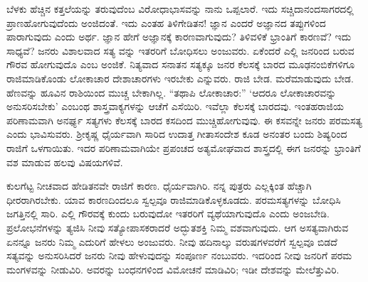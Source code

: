 ಬೆಳಕು ಹೆಚ್ಚಿನ ಕತ್ತಲೆಯನ್ನು ತರುವುದೆಂಬ ವಿರೋಧಾಭಾಸವನ್ನು ನಾನು ಒಪ್ಪಲಾರೆ. ಇದು ಸಚ್ಚಿದಾನಂದಸಾಗರದಲ್ಲಿ ಪ್ರಾಣಹೋಗುವುದೆಂದು ಅಂಜಿದಂತೆ. ಇದು ಎಂತಹ ತಿಳಿಗೇಡಿತನ! ಜ್ಞಾನ ಎಂದರೆ ಅಜ್ಞಾನದ ತಪ್ಪುಗಳಿಂದ ಪಾರಾಗುವುದು ಎಂದು ಅರ್ಥ. ಜ್ಞಾನ ಹೇಗೆ ಅಜ್ಞಾನಕ್ಕೆ ಕಾರಣವಾಗುವುದು? ತಿಳಿವಳಿಕೆ ಭ್ರಾಂತಿಗೆ ಕಾರಣವೆ? ಇದು ಸಾಧ್ಯವೆ? ಜನರು ವಿಶಾಲವಾದ ಸತ್ಯ ವನ್ನು ಇತರರಿಗೆ ಬೋಧಿಸಲು ಅಂಜುವರು. ಏಕೆಂದರೆ ಎಲ್ಲಿ ಜನರಿಂದ ಬರುವ ಗೌರವ ಹೋಗುವುದೊ ಎಂಬ ಅಂಜಿಕೆ. ನಿತ್ಯವಾದ ಸನಾತನ ಸತ್ಯಕ್ಕೂ ಜನರ ಕೆಲಸಕ್ಕೆ ಬಾರದ ಮೂಢನಂಬಿಕೆಗಳಿಗೂ ರಾಜಿಮಾಡಿಕೊಂಡು ಲೋಕಾಚಾರ ದೇಶಾಚಾರಗಳು ಇರಬೇಕು ಎನ್ನುವರು. ರಾಜಿ ಬೇಡ. ಮರೆಮಾಡುವುದು ಬೇಡ. ಹೆಣವನ್ನು ಹೂವಿನ ರಾಶಿಯಿಂದ ಮುಚ್ಚ ಬೇಕಾಗಿಲ್ಲ. “ತಥಾಪಿ ಲೋಕಾಚಾರ:” ‘ಆದರೂ ಲೋಕಾಚಾರವನ್ನು ಅನುಸರಿಸಬೇಕು’ ಎಂಬಂಥ ಶಾಸ್ತ್ರವಾಕ್ಯಗಳನ್ನು ಆಚೆಗೆ ಎಸೆಯಿರಿ. ಇವೆಲ್ಲಾ ಕೆಲಸಕ್ಕೆ ಬಾರದವು. ಇಂತಹರಾಜಿಯ ಪರಿಣಾಮವಾಗಿ ಅನರ್ಘ್ಯ ಸತ್ಯಗಳು ಕೆಲಸಕ್ಕೆ ಬಾರದ ಕಸದಿಂದ ಮುಚ್ಚಿಹೋಗುವುವು. ಈ ಕಸವನ್ನೇ ಜನರು ಪರಮಸತ್ಯ ಎಂದು ಭಾವಿಸುವರು. ಶ‍್ರೀಕೃಷ್ಣ ಧೈರ್ಯವಾಗಿ ಸಾರಿದ ಉದಾತ್ತ ಗೀತಾಸಂದೇಶ ಕೂಡ ಅನಂತರ ಬಂದು ಶಿಷ್ಯರಿಂದ ರಾಜಿಗೆ ಒಳಗಾಯಿತು. ಇದರ ಪರಿಣಾಮವಾಗಿಯೇ ಪ್ರಪಂಚದ ಅತ್ಯಮೋಘವಾದ ಶಾಸ್ತ್ರದಲ್ಲಿ ಈಗ ಜನರನ್ನು ಭ್ರಾಂತಿಗೆ ವಶ ಮಾಡುವ ಹಲವು ವಿಷಯಗಳಿವೆ.

ಕುಲಗೆಟ್ಟ ನೀಚವಾದ ಹೇಡಿತನವೇ ರಾಜಿಗೆ ಕಾರಣ. ಧೈರ್ಯವಾಗಿರಿ. ನನ್ನ ಪುತ್ರರು ಎಲ್ಲಕ್ಕಿಂತ ಹೆಚ್ಚಾಗಿ ಧೀರರಾಗಿರಬೇಕು. ಯಾವ ಕಾರಣದಿಂದಲೂ ಸ್ವಲ್ಪವೂ ರಾಜಿಮಾಡಿಕೊಳ್ಳಕೂಡದು. ಪರಮಸತ್ಯಗಳನ್ನು ಬೋಧಿಸಿ ಜಗತ್ತಿನಲ್ಲಿ ಸಾರಿ. ಎಲ್ಲಿ ಗೌರವಕ್ಕೆ ಕುಂದು ಬರುವುದೋ ಇತರರಿಗೆ ವ್ಯಥೆಯಾಗುವುದೊ ಎಂದು ಅಂಜಬೇಡಿ. ಪ್ರಲೋಭನೆಗಳನ್ನು ತ್ಯಜಿಸಿ ನೀವು ಸತ್ಯೋಪಾಸಕರಾದರೆ ಅದ್ಭುತಶಕ್ತಿ ನಿಮ್ಮ ವಶವಾಗುವುದು. ಆಗ ಅಸತ್ಯವಾಗಿರುವ ಏನನ್ನೂ ಜನರು ನಿಮ್ಮ ಎದುರಿಗೆ ಹೇಳಲು ಅಂಜುವರು. ನೀವು ಹದಿನಾಲ್ಕು ವರುಷಗಳವರೆಗೆ ಸ್ವಲ್ಪವೂ ಬಿಡದೆ ಸತ್ಯವನ್ನು ಅನುಸರಿಸಿದರೆ ಜನರು ನೀವು ಹೇಳುವುದನ್ನು ಸಂಪೂರ್ಣ ನಂಬುವರು. ಇದರಿಂದ ನೀವು ಜನರಿಗೆ ಪರಮ ಮಂಗಳವನ್ನು ನೀಡುವಿರಿ. ಅವರನ್ನು ಬಂಧನಗಳಿಂದ ವಿಮೋಚನೆ ಮಾಡಿವಿರಿ; ಇಡೀ ದೇಶವನ್ನು ಮೇಲೆತ್ತುವಿರಿ.

